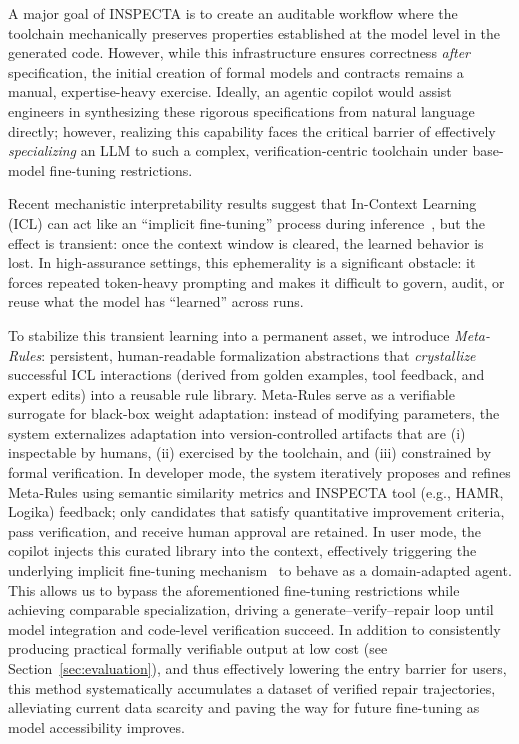 \documentclass[conference]{IEEEtran}
\begin{document}
A major goal of INSPECTA is to create an auditable workflow where the toolchain mechanically preserves properties established at the model level in the generated code. However, while this infrastructure ensures correctness \emph{after} specification, the initial creation of formal models and contracts remains a manual, expertise-heavy exercise. Ideally, an agentic copilot would assist engineers in synthesizing these rigorous specifications from natural language directly; however, realizing this capability faces the critical barrier of effectively \emph{specializing} an LLM to such a complex, verification-centric toolchain under base-model fine-tuning restrictions.

Recent mechanistic interpretability results suggest that In-Context Learning (ICL) can act like an ``implicit fine-tuning'' process during inference~\cite{vonoswald2023transformers}, but the effect is transient: once the context window is cleared, the learned behavior is lost. In high-assurance settings, this ephemerality is a significant obstacle: it forces repeated token-heavy prompting and makes it difficult to govern, audit, or reuse what the model has ``learned'' across runs.

To stabilize this transient learning into a permanent asset, we introduce \textit{Meta-Rules}: persistent, human-readable formalization abstractions that \emph{crystallize} successful ICL interactions (derived from golden examples, tool feedback, and expert edits) into a reusable rule library. Meta-Rules serve as a verifiable surrogate for black-box weight adaptation: instead of modifying parameters, the system externalizes adaptation into version-controlled artifacts that are (i) inspectable by humans, (ii) exercised by the toolchain, and (iii) constrained by formal verification.
%
In developer mode, the system iteratively proposes and refines Meta-Rules using semantic similarity metrics and INSPECTA tool (e.g., HAMR, Logika) feedback; only candidates that satisfy quantitative improvement criteria, pass verification, and receive human approval are retained. In user mode, the copilot injects this curated library into the context, effectively triggering the underlying implicit fine-tuning mechanism~\cite{vonoswald2023transformers} to behave as a domain-adapted agent. This allows us to bypass the aforementioned fine-tuning restrictions while achieving comparable specialization, driving a generate--verify--repair loop until model integration and code-level verification succeed.
%
In addition to consistently producing practical formally verifiable output at low cost (see Section~\ref{sec:evaluation}), and thus effectively lowering the entry barrier for users, this method systematically accumulates a dataset of verified repair trajectories, alleviating current data scarcity and paving the way for future fine-tuning as model accessibility improves.
\end{document}
